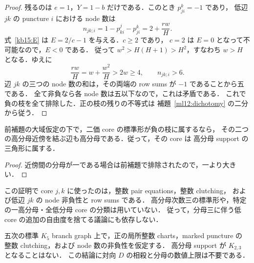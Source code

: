 \begin{proof}
残るのは $e=1$，$Y=1-b$ だけである．このとき $p^k_{ji}=-1$ であり，
低辺 $jk$ の puncture $i$ における node 数は
\begin{equation}\label{kb15:exceptional-node}
 n_{jk;i}=1-p^j_{ki}-p^k_{ji}
 =2+\frac{rw}{H}.
\end{equation}
式~\eqref{kb15:E} は $E=2/c-1$ を与える．$c\geq2$ であり，
$c=2$ は $E=0$ となって不可能なので，$E<0$ である．
従って $w^2>H(H+1)>H^2$，すなわち $w>H$ となる．ゆえに
\[
 \frac{rw}{H}=w+\frac{w^2}{H}>2w\geq4,
 \qquad n_{jk;i}>6.
\]
辺 $jk$ の三つの node 数の和は，その両端の row sums が $-1$ であることから五である．
全て非負なら各 node 数は五以下なので，これは矛盾である．
これで負の枝を全て排除した．正の枝の残りの不等式は
補題~\ref{ml12:dichotomy} の二分から従う．
\end{proof}

\begin{corollary}[負の枝は高分母三角形に属する]
\label{kb15:negative-closes-triangle}
前補題の大域仮定の下で，二価 core の標準形が負の枝に属するなら，
その二つの高分母近傍を結ぶ辺も高分母である．従って，その core は
高分母 support の三角形に属する．
\end{corollary}

\begin{proof}
近傍間の分母が一である場合は前補題で排除されたので，一より大きい．
\end{proof}

この証明で core $j,k$ に使ったのは，整数 pair equations，整数 clutching，
および低辺 $jk$ の node 非負性と row sums である．
高分母次数三の標準形や，特定の一高分母・全低分母 core の分類は用いていない．
従って，分母三に伴う低 core の追加の自由度を捨てる議論にも依存しない．

\begin{theorem}
\label{kb15:no-K23}
五次の標準 $K_5$ branch graph 上で，正の局所整数 charts，marked puncture の
整数 clutching，および node 数の非負性を仮定する．
高分母 support が $K_{2,3}$ となることはない．
この結論に対向 $D$ の相殺と分母の数値上限は不要である．
\end{theorem}

